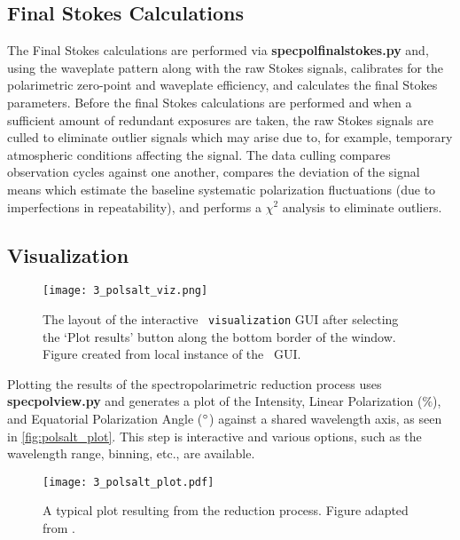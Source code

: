 \subsection{Final Stokes Calculations}

The Final Stokes calculations are performed via \textbf{specpolfinalstokes.py} and, using the waveplate pattern along with the raw Stokes signals, calibrates for the polarimetric zero-point and waveplate efficiency, and calculates the final Stokes parameters. Before the final Stokes calculations are performed and when a sufficient amount of redundant exposures are taken, the raw Stokes signals are culled to eliminate outlier signals which may arise due to, for example, temporary atmospheric conditions affecting the signal. The data culling compares observation cycles against one another, compares the deviation of the signal means which estimate the baseline systematic polarization fluctuations (due to imperfections in repeatability), and performs a $\chi^2$ analysis to eliminate outliers.

\subsection{Visualization}

\begin{figure}[t]
    \centering
    \texttt{[image: 3\_polsalt\_viz.png]}
    \caption{The layout of the interactive \polsalt\ \texttt{visualization} \gls{GUI} after selecting the `Plot results' button along the bottom border of the window. Figure created from local instance of the \polsalt\ \gls{GUI}.}
    \label{fig:polsalt_gui_vis}
\end{figure}

Plotting the results of the spectropolarimetric reduction process uses \textbf{specpolview.py} and generates a plot of the Intensity, Linear Polarization ($\%$), and Equatorial Polarization Angle ($\hbox{$^\circ$}$) against a shared wavelength axis, as seen in \autoref{fig:polsalt_plot}. This step is interactive and various options, such as the wavelength range, binning, etc., are available.

\begin{figure}[t]
    \centering
    \texttt{[image: 3\_polsalt\_plot.pdf]}
    \caption{A typical plot resulting from the reduction process. Figure adapted from \citep{cooper_HEASA2022}.}
    \label{fig:polsalt_plot}
\end{figure}

